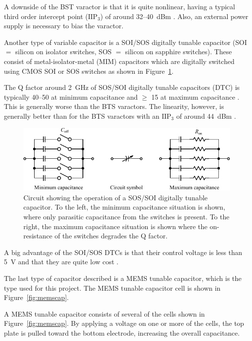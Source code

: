 A downside of the BST varactor is that it is quite nonlinear, having a typical third order intercept point ($\text{IIP}_3$) of around 32--\SI{40}{dBm} \cite{gu2014rf}. Also, an external power supply is necessary to bias the varactor.

Another type of variable capacitor is a SOI/SOS digitally tunable capacitor (SOI $=$ silicon on isolator switches, SOS $=$ silicon on sapphire switches). These consist of metal-isolator-metal (MIM) capacitors which are digitally switched using CMOS SOI or SOS switches as shown in Figure~\ref{fig:sossoiswitch}. 

The Q factor around \SI{2}{GHz} of SOS/SOI digitally tunable capacitors (DTC) is typically 40--50 at minimum capacitance and $\geq$ 15 at maximum capacitance \cite{gu2014rf}. This is generally worse than the BTS varactors. The linearity, however, is generally better than for the BTS varactors with an $\text{IIP}_3$ of around \SI{44}{dBm} \cite{gu2014rf}.

\begin{figure}[htbp]
    \centering
    \includegraphics{img/analysis/sossoi_dtc}
    \caption{Circuit showing the operation of a SOS/SOI digitally tunable capacitor. To the left, the minimum capacitance situation is shown, where only parasitic capacitance from the switches is present. To the right, the maximum capacitance situation is shown where the on-resistance of the switches degrades the Q factor.}
    \label{fig:sossoiswitch}
\end{figure}

A big advantage of the SOI/SOS DTCs is that their control voltage is less than \SI{5}{V} and that they are quite low cost \cite{gu2014rf}.

The last type of capacitor described is a MEMS tunable capacitor, which is the type used for this project. The MEMS tunable capacitor cell is shown in Figure~\ref{fig:memscap}.

A MEMS tunable capacitor consists of several of the cells shown in Figure~\ref{fig:memscap}. By applying a voltage on one or more of the cells, the top plate is pulled toward the bottom electrode, increasing the overall capacitance. 

